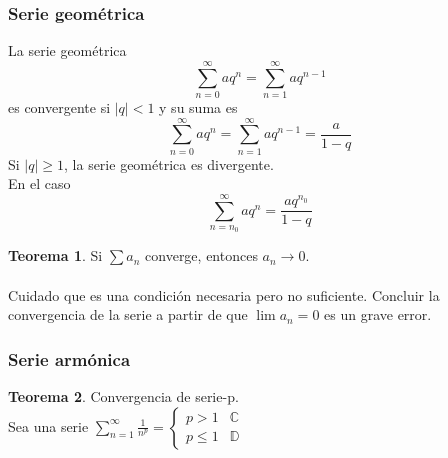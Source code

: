 \documentclass[10pt]{article}
\theoremstyle{definition}
\newtheorem{theorem}{Teorema}[section]
\begin{document}
\subsubsection{Serie geométrica}
La serie geométrica $$\sum_{n=0}^{\infty} aq^n = \sum_{n=1}^{\infty} aq^{n-1}$$
es convergente si $|q|<1$ y su suma es
$$\sum_{n=0}^{\infty} aq^n=\sum_{n=1}^{\infty} aq^{n-1}=\frac{a}{1-q}$$
Si $|q|\ge 1$, la serie geométrica es divergente.\\
En el caso $$\sum_{n=n_0}^{\infty} aq^n=\frac{aq^{n_0}}{1-q}$$
\begin{theorem}
	Si $\sum a_n$ converge, entonces $a_n \to 0$.\\\\
	Cuidado que es una condición necesaria pero no suficiente. Concluir la convergencia de la serie a partir de que $\lim a_n=0$ es un grave error.
\end{theorem}
\subsubsection{Serie armónica}
\begin{theorem}{Convergencia de serie-p.}
	\\Sea una serie $\sum _{n=1}^{\infty }\frac{1}{n^{p}} =\begin{cases}p >1 & \mathbb{C}\\p\le 1 & \mathbb{D}\end{cases}$
\end{theorem}
\newpage
\end{document}
